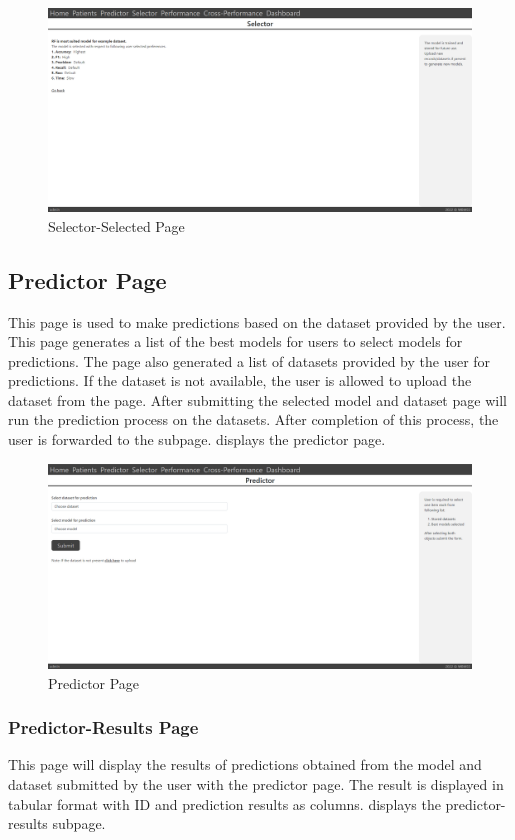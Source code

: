 \begin{figure}[H]
  \centering
  \includegraphics[width=0.7\columnwidth]{media/website/pages/selector_selected.png}
  \caption{Selector-Selected Page}
  \label{fig:web_selector_selected_page}
\end{figure}

\subsection{Predictor Page} \label{subsec:predictor_page}
This page is used to make predictions based on the dataset provided by the user. This page generates a list of the best models for users to select models for predictions. The page also generated a list of datasets provided by the user for predictions. If the dataset is not available, the user is allowed to upload the dataset from the page. After submitting the selected model and dataset page will run the prediction process on the datasets. After completion of this process, the user is forwarded to the subpage.  displays the predictor page.

\begin{figure}[H]
  \centering
  \includegraphics[width=0.7\columnwidth]{media/website/pages/predictor.png}
  \caption{Predictor Page}
  \label{fig:web_predictor_page}
\end{figure}

\subsubsection{Predictor-Results Page} \label{subsubsec:predictor_result_page}
This page will display the results of predictions obtained from the model and dataset submitted by the user with the predictor page. The result is displayed in tabular format with ID and prediction results as columns.  displays the predictor-results subpage.

